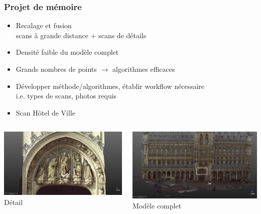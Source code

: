 \documentclass{beamer}
\begin{document}
\begin{frame}
\frametitle{Projet de mémoire}
	\begin{itemize}
	\item Recalage et fusion
		\\ scans à grande distance + scans de détails
	\item Densité faible du modèle complet
	\item Grands nombres de points $\rightarrow$ algorithmes efficaces
	\item Développer méthode/algorithmes, établir workflow nécessaire
		\\ i.e. types de scans, photos requis
	\item Scan Hôtel de Ville
	\end{itemize}
	\begin{columns}
		\begin{column}[T]{.5\textwidth}
			\includegraphics[width=\textwidth]{HotelDeVille_08.png}
			\center \Large{Détail}
		\end{column}
		\begin{column}[T]{.5\textwidth}
			\includegraphics[width=\textwidth]{HotelDeVille_06rect.png}
			\center \Large{Modèle complet}
		\end{column}
	\end{columns}
\end{frame}
\end{document}
